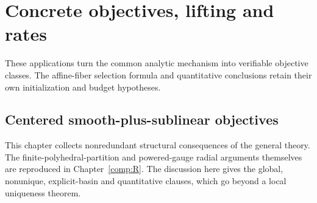 \chapter{Concrete objectives, lifting and rates}\label{comp:F}\label{F:chapter}
\renewcommand{\ModuleTag}{6}
These applications turn the common analytic mechanism into verifiable objective classes. The affine-fiber selection formula and quantitative conclusions retain their own initialization and budget hypotheses.


\section{Centered smooth-plus-sublinear objectives}

This chapter collects nonredundant structural consequences of the general theory. The finite-polyhedral-partition and powered-gauge radial arguments themselves are reproduced in Chapter~\ref{comp:R}. The discussion here gives the global, nonunique, explicit-basin and quantitative clauses, which go beyond a local uniqueness theorem.

